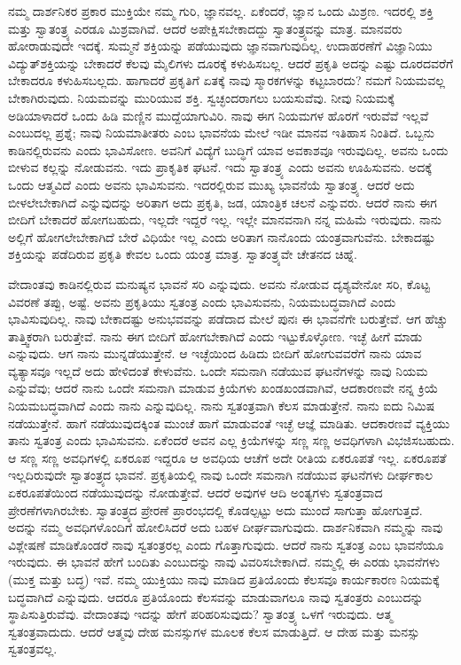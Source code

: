 ನಮ್ಮ ದಾರ್ಶನಿಕರ ಪ್ರಕಾರ ಮುಕ್ತಿಯೇ ನಮ್ಮ ಗುರಿ, ಜ್ಞಾನವಲ್ಲ. ಏಕೆಂದರೆ, ಜ್ಞಾನ ಒಂದು ಮಿಶ್ರಣ. ಇದರಲ್ಲಿ ಶಕ್ತಿ ಮತ್ತು ಸ್ವಾತಂತ್ರ್ಯ ಎರಡೂ ಮಿಶ್ರವಾಗಿವೆ. ಆದರೆ ಅಪೇಕ್ಷಿಸಬೇಕಾದದ್ದು ಸ್ವಾತಂತ್ರ್ಯವನ್ನು ಮಾತ್ರ. ಮಾನವರು ಹೋರಾಡುವುದೇ ಇದಕ್ಕೆ. ಸುಮ್ಮನೆ ಶಕ್ತಿಯನ್ನು ಪಡೆಯುವುದು ಜ್ಞಾನವಾಗುವುದಿಲ್ಲ. ಉದಾಹರಣೆಗೆ ವಿಜ್ಞಾನಿಯು ವಿದ್ಯುತ್​ಶಕ್ತಿಯನ್ನು ಬೇಕಾದರೆ ಕೆಲವು ಮೈಲಿಗಳು ದೂರಕ್ಕೆ ಕಳುಹಿಸಬಲ್ಲ. ಆದರೆ ಪ್ರಕೃತಿ ಅದನ್ನು ಎಷ್ಟು ದೂರದವರೆಗೆ ಬೇಕಾದರೂ ಕಳುಹಿಸಬಲ್ಲದು. ಹಾಗಾದರೆ ಪ್ರಕೃತಿಗೆ ಏತಕ್ಕೆ ನಾವು ಸ್ಮಾರಕಗಳನ್ನು ಕಟ್ಟಬಾರದು? ನಮಗೆ ನಿಯಮವಲ್ಲ ಬೇಕಾಗಿರುವುದು. ನಿಯಮವನ್ನು ಮುರಿಯುವ ಶಕ್ತಿ. ಸ್ವಚ್ಛಂದರಾಗಲು ಬಯಸುವೆವು. ನೀವು ನಿಯಮಕ್ಕೆ ಅಡಿಯಾಳಾದರೆ ಒಂದು ಹಿಡಿ ಮಣ್ಣಿನ ಮುದ್ದೆಯಾಗುವಿರಿ. ನಾವು ಈಗ ನಿಯಮಗಳ ಹೊರಗೆ ಇರುವೆವೆ ಇಲ್ಲವೆ ಎಂಬುದಲ್ಲ ಪ್ರಶ್ನೆ; ನಾವು ನಿಯಮಾತೀತರು ಎಂಬ ಭಾವನೆಯ ಮೇಲೆ ಇಡೀ ಮಾನವ ಇತಿಹಾಸ ನಿಂತಿದೆ. ಒಬ್ಬನು ಕಾಡಿನಲ್ಲಿರುವನು ಎಂದು ಭಾವಿಸೋಣ. ಅವನಿಗೆ ವಿದ್ಯೆಗೆ ಬುದ್ಧಿಗೆ ಯಾವ ಅವಕಾಶವೂ ಇರುವುದಿಲ್ಲ. ಅವನು ಒಂದು ಬೀಳುವ ಕಲ್ಲನ್ನು ನೋಡುವನು. ಇದು ಪ್ರಾಕೃತಿಕ ಘಟನೆ. ಇದು ಸ್ವಾತಂತ್ರ್ಯ ಎಂದು ಅವನು ಊಹಿಸುವನು. ಅದಕ್ಕೆ ಒಂದು ಆತ್ಮವಿದೆ ಎಂದು ಅವನು ಭಾವಿಸುವನು. ಇದರಲ್ಲಿರುವ ಮುಖ್ಯ ಭಾವನೆಯೆ ಸ್ವಾತಂತ್ರ್ಯ. ಆದರೆ ಅದು ಬೀಳಲೇಬೇಕಾಗಿದೆ ಎನ್ನುವುದನ್ನು ಅರಿತಾಗ ಅದು ಪ್ರಕೃತಿ, ಜಡ, ಯಾಂತ್ರಿಕ ಚಲನೆ ಎನ್ನುವರು. ಆದರೆ ನಾನು ಈಗ ಬೀದಿಗೆ ಬೇಕಾದರೆ ಹೋಗಬಹುದು, ಇಲ್ಲದೇ ಇದ್ದರೆ ಇಲ್ಲ. ಇಲ್ಲೇ ಮಾನವನಾಗಿ ನನ್ನ ಮಹಿಮೆ ಇರುವುದು. ನಾನು ಅಲ್ಲಿಗೆ ಹೋಗಲೇಬೇಕಾಗಿದೆ ಬೇರೆ ವಿಧಿಯೇ ಇಲ್ಲ ಎಂದು ಅರಿತಾಗ ನಾನೊಂದು ಯಂತ್ರವಾಗುವೆನು. ಬೇಕಾದಷ್ಟು ಶಕ್ತಿಯನ್ನು ಪಡೆದಿರುವ ಪ್ರಕೃತಿ ಕೇವಲ ಒಂದು ಯಂತ್ರ ಮಾತ್ರ. ಸ್ವಾತಂತ್ರ್ಯವೇ ಚೇತನದ ಚಿಹ್ನೆ.

ವೇದಾಂತವು ಕಾಡಿನಲ್ಲಿರುವ ಮನುಷ್ಯನ ಭಾವನೆ ಸರಿ ಎನ್ನುವುದು. ಅವನು ನೋಡುವ ದೃಶ್ಯವೇನೋ ಸರಿ, ಕೊಟ್ಟ ವಿವರಣೆ ತಪ್ಪು, ಅಷ್ಟೆ. ಅವನು ಪ್ರಕೃತಿಯು ಸ್ವತಂತ್ರ ಎಂದು ಭಾವಿಸುವನು, ನಿಯಮಬದ್ಧವಾಗಿದೆ ಎಂದು ಭಾವಿಸುವುದಿಲ್ಲ. ನಾವು ಬೇಕಾದಷ್ಟು ಅನುಭವವನ್ನು ಪಡೆದಾದ ಮೇಲೆ ಪುನಃ ಈ ಭಾವನೆಗೇ ಬರುತ್ತೇವೆ. ಆಗ ಹೆಚ್ಚು ತಾತ್ತ್ವಿಕರಾಗಿ ಬರುತ್ತೇವೆ. ನಾನು ಈಗ ಬೀದಿಗೆ ಹೋಗಬೇಕಾಗಿದೆ ಎಂದು ಇಟ್ಟುಕೊಳ್ಳೋಣ. ಇಚ್ಛೆ ಹೀಗೆ ಮಾಡು ಎನ್ನುವುದು. ಆಗ ನಾನು ಮುನ್ನಡೆಯುತ್ತೇನೆ. ಆ ಇಚ್ಛೆಯಿಂದ ಹಿಡಿದು ಬೀದಿಗೆ ಹೋಗುವವರೆಗೆ ನಾನು ಯಾವ ವ್ಯತ್ಯಾಸವೂ ಇಲ್ಲದೆ ಅದು ಹೇಳಿದಂತೆ ಕೇಳುವೆನು. ಒಂದೇ ಸಮನಾಗಿ ನಡೆಯುವ ಘಟನೆಗಳನ್ನು ನಾವು ನಿಯಮ ಎನ್ನುವೆವು; ಆದರೆ ನಾನು ಒಂದೇ ಸಮನಾಗಿ ಮಾಡುವ ಕ್ರಿಯೆಗಳು ಖಂಡಖಂಡವಾಗಿವೆ, ಆದಕಾರಣವೇ ನನ್ನ ಕ್ರಿಯೆ ನಿಯಮಬದ್ಧವಾಗಿದೆ ಎಂದು ನಾನು ಎನ್ನುವುದಿಲ್ಲ. ನಾನು ಸ್ವತಂತ್ರವಾಗಿ ಕೆಲಸ ಮಾಡುತ್ತೇನೆ. ನಾನು ಐದು ನಿಮಿಷ ನಡೆಯುತ್ತೇನೆ. ಹಾಗೆ ನಡೆಯುವುದಕ್ಕಿಂತ ಮುಂಚೆ ಹಾಗೆ ಮಾಡುವಂತೆ ಇಚ್ಛೆ ಆಜ್ಞೆ ಮಾಡಿತು. ಆದಕಾರಣವೆ ವ್ಯಕ್ತಿಯು ತಾನು ಸ್ವತಂತ್ರ ಎಂದು ಭಾವಿಸುವನು. ಏಕೆಂದರೆ ಅವನ ಎಲ್ಲ ಕ್ರಿಯೆಗಳನ್ನು ಸಣ್ಣ ಸಣ್ಣ ಅವಧಿಗಳಾಗಿ ವಿಭಜಿಸಬಹುದು. ಆ ಸಣ್ಣ ಸಣ್ಣ ಅವಧಿಗಳಲ್ಲಿ ಏಕರೂಪ ಇದ್ದರೂ ಆ ಅವಧಿಯ ಆಚೆಗೆ ಅದೇ ರೀತಿಯ ಏಕರೂಪತೆ ಇಲ್ಲ. ಏಕರೂಪತೆ ಇಲ್ಲದಿರುವುದೇ ಸ್ವಾತಂತ್ರ್ಯದ ಭಾವನೆ. ಪ್ರಕೃತಿಯಲ್ಲಿ ನಾವು ಒಂದೇ ಸಮನಾಗಿ ನಡೆಯುವ ಘಟನೆಗಳು ದೀರ್ಘಕಾಲ ಏಕರೂಪತೆಯಿಂದ ನಡೆಯುವುದನ್ನು ನೋಡುತ್ತೇವೆ. ಆದರೆ ಅವುಗಳ ಆದಿ ಅಂತ್ಯಗಳು ಸ್ವತಂತ್ರವಾದ ಪ್ರೇರಣೆಗಳಾಗಿರಬೇಕು. ಸ್ವಾತಂತ್ರ್ಯದ ಪ್ರೇರಣೆ ಪ್ರಾರಂಭದಲ್ಲಿ ಕೊಡಲ್ಪಟ್ಟು ಅದು ಮುಂದೆ ಸಾಗುತ್ತಾ ಹೋಗುತ್ತದೆ. ಅದನ್ನು ನಮ್ಮ ಅವಧಿಗಳೊಂದಿಗೆ ಹೋಲಿಸಿದರೆ ಅದು ಬಹಳ ದೀರ್ಘವಾಗುವುದು. ದಾರ್ಶನಿಕವಾಗಿ ನಮ್ಮನ್ನು ನಾವು ವಿಶ್ಲೇಷಣೆ ಮಾಡಿಕೊಂಡರೆ ನಾವು ಸ್ವತಂತ್ರರಲ್ಲ ಎಂದು ಗೊತ್ತಾಗುವುದು. ಆದರೆ ನಾನು ಸ್ವತಂತ್ರ ಎಂಬ ಭಾವನೆಯೂ ಇರುವುದು. ಈ ಭಾವನೆ ಹೇಗೆ ಬಂದಿತು ಎಂಬುದನ್ನು ನಾವು ವಿವರಿಸಬೇಕಾಗಿದೆ. ನಮ್ಮಲ್ಲಿ ಈ ಎರಡು ಭಾವನೆಗಳು (ಮುಕ್ತ ಮತ್ತು ಬದ್ಧ) ಇವೆ. ನಮ್ಮ ಯುಕ್ತಿಯು ನಾವು ಮಾಡಿದ ಪ್ರತಿಯೊಂದು ಕೆಲಸವೂ ಕಾರ್ಯಕಾರಣ ನಿಯಮಕ್ಕೆ ಬದ್ಧವಾಗಿದೆ ಎನ್ನುವುದು. ಆದರೂ ಪ್ರತಿಯೊಂದು ಕೆಲಸವನ್ನು ಮಾಡುವಾಗಲೂ ನಾವು ಸ್ವತಂತ್ರರು ಎಂಬುದನ್ನು ಸ್ಥಾಪಿಸುತ್ತಿರುವೆವು. ವೇದಾಂತವು ಇದನ್ನು ಹೇಗೆ ಪರಿಹರಿಸುವುದು? ಸ್ವಾತಂತ್ರ್ಯ ಒಳಗೆ ಇರುವುದು. ಆತ್ಮ ಸ್ವತಂತ್ರವಾದುದು. ಆದರೆ ಆತ್ಮವು ದೇಹ ಮನಸ್ಸುಗಳ ಮೂಲಕ ಕೆಲಸ ಮಾಡುತ್ತಿದೆ. ಆ ದೇಹ ಮತ್ತು ಮನಸ್ಸು ಸ್ವತಂತ್ರವಲ್ಲ.


